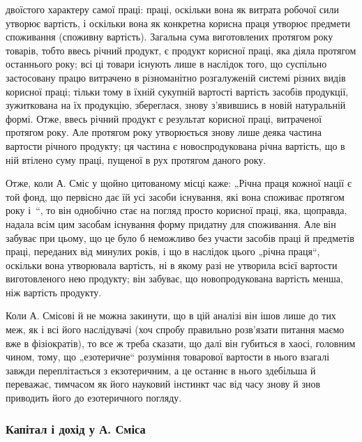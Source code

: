 \parcont{}  %
двоїстого характеру самої праці: праці, оскільки вона як витрата робочої сили утворює вартість, і
оскільки вона як конкретна корисна праця утворює предмети споживання (споживну вартість). Загальна
сума виготовлених протягом року товарів, тобто ввесь річний продукт, є продукт корисної праці, яка
діяла протягом останнього року; всі ці
товари існують лише в наслідок того, що суспільно застосовану працю витрачено в різноманітно
розгалуженій системі різних видів корисної праці; тільки тому в їхній сукупній вартості вартість
засобів продукції, зужиткована на їх продукцію, збереглася, знову з’явившись в новій натуральній
формі. Отже, ввесь річний продукт є результат корисної праці, витраченої протягом року. Але протягом
року утворюється знову лише деяка частина вартости річного продукту; ця частина є новоспродукована
річна вартість, що в ній втілено суму праці, пущеної в рух протягом даного року.

Отже, коли А. Сміс у щойно цитованому місці каже: „Річна праця кожної нації є той фонд, що первісно
дає їй усі засоби існування, які вона споживає протягом року і~“, то він однобічно стає на
погляд просто корисної праці, яка, щоправда, надала всім цим засобам існування форму придатну для
споживання. Але він забуває при цьому, що це
було б неможливо без участи засобів праці й предметів праці, переданих від минулих років, і що в
наслідок цього „річна праця“, оскільки вона утворювала вартість, ні в якому разі не утворила всієї
вартости виготовленого нею продукту; він забуває, що новопродукована вартість менша, ніж вартість
продукту.

Коли А. Смісові й не можна закинути, що в цій аналізі він ішов лише до тих меж, як і всі його
наслідувачі (хоч спробу правильно розв’язати питання маємо вже в фізіократів), то все ж треба
сказати, що далі він губиться в хаосі, головним чином, тому, що „езотеричне“ розуміння товарової
вартости в нього взагалі завжди переплітається з екзотеричним, а це останнє в нього здебільша й
переважає, тимчасом як його науковий інстинкт час від часу знову й знов приводить його до
езотеричного погляду.

\subsubsection{Капітал і дохід у А. Сміса}

